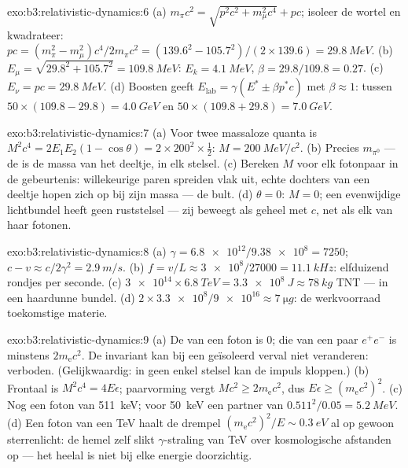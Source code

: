 \begin{solution}{exo:b3:relativistic-dynamics:6}
(a) $m_\pi c^2 = \sqrt{p^2c^2 + m_\mu^2c^4} + pc$; isoleer de wortel en
kwadrateer: $pc = (m_\pi^2 - m_\mu^2)c^4/2m_\pi c^2 =
(139.6^2 - 105.7^2)/(2 \times 139.6) = \qty{29.8}{MeV}$. (b) $E_\mu =
\sqrt{29.8^2 + 105.7^2} = \qty{109.8}{MeV}$: $E_k = \qty{4.1}{MeV}$,
$\beta = 29.8/109.8 = 0.27$. (c) $E_\nu = pc = \qty{29.8}{MeV}$. (d)
Boosten geeft $E_{\text{lab}} = \gamma(E^* \pm \beta p^*c)$ met $\beta
\approx 1$: tussen $50 \times (109.8 - 29.8) = \qty{4.0}{GeV}$ en
$50 \times (109.8 + 29.8) = \qty{7.0}{GeV}$.
\end{solution}

\begin{solution}{exo:b3:relativistic-dynamics:7}
(a) Voor twee massaloze quanta is $M^2c^4 = 2E_1E_2(1 - \cos\theta) =
2 \times 200^2 \times \tfrac12$: $M = \qty{200}{MeV}/c^2$. (b)
Precies $m_{\pi^0}$ --- de  is de massa van het deeltje,
in elk stelsel. (c) Bereken $M$ voor elk fotonpaar in de gebeurtenis:
willekeurige paren spreiden vlak uit, echte dochters van een deeltje
hopen zich op bij zijn massa --- de bult. (d) $\theta = 0$: $M = 0$; een
evenwijdige lichtbundel heeft geen ruststelsel --- zij beweegt als geheel
met $c$, net als elk van haar fotonen.
\end{solution}

\begin{solution}{exo:b3:relativistic-dynamics:8}
(a) $\gamma = \num{6.8e12}/\num{9.38e8} = 7250$; $c - v \approx
c/2\gamma^2 = \qty{2.9}{m/s}$. (b) $f = v/L \approx \num{3e8}/27000 =
\qty{11.1}{kHz}$: elfduizend rondjes per seconde. (c) $\num{3e14}
\times \qty{6.8}{TeV} = \qty{3.3e8}{J} \approx \qty{78}{kg}$ TNT
--- in een haardunne bundel. (d) $2 \times \num{3.3e8}/\num{9e16} \approx
\qty{7}{\micro g}$: de werkvoorraad toekomstige materie.
\end{solution}

\begin{solution}{exo:b3:relativistic-dynamics:9}
(a) De  van een foton is $0$; die van een paar $e^+e^-$
is minstens $2m_{\text{e}}c^2$. De invariant kan bij een geïsoleerd
verval niet veranderen: verboden. (Gelijkwaardig: in geen enkel stelsel
kan de impuls kloppen.) (b) Frontaal is $M^2c^4 = 4E\epsilon$;
paarvorming vergt $Mc^2 \ge
2m_{\text{e}}c^2$, dus $E\epsilon \ge (m_{\text{e}}c^2)^2$. (c) Nog een foton van \qty{511}{keV}; voor
\qty{50}{keV} een partner van $0.511^2/0.05 = \qty{5.2}{MeV}$. (d) Een
foton van een TeV haalt de drempel $(m_{\text{e}}c^2)^2/E \sim \qty{0.3}{eV}$ al op gewoon sterrenlicht: de hemel zelf slikt
$\gamma$-straling van TeV over kosmologische afstanden op --- het heelal
is niet bij elke energie doorzichtig.
\end{solution}

